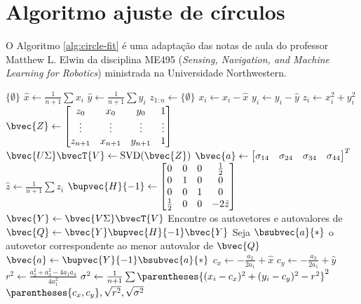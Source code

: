 \section{Algoritmo ajuste de círculos}
\label{annex:circle-fit}
O Algoritmo \ref{alg:circle-fit} é uma adaptação das notas de aula do 
professor Matthew L. Elwin da disciplina ME495 (\textit{Sensing, Navigation, and Machine Learning for Robotics}) ministrada na 
Universidade Northwestern.
\begin{algorithm}[h]
  \caption{}
  \label{alg:circle-fit}
\begin{algorithmic}[1]
      \State \Return $\{\emptyset\}$
    \EndIf
    \State $\hat{x} \gets \frac{1}{n+1} \sum x_i$
    \State $\hat{y} \gets \frac{1}{n+1} \sum y_i$
    \State $z_{1:n} \gets \{ \emptyset \}$
      \State $x_i \gets x_i - \hat{x}$
      \State $y_i \gets y_i - \hat{y}$
      \State $z_i \gets x_i^2 + y_i^2$
    \EndFor
    \State $\displaystyle \bvec{Z} \gets \begin{bmatrix}
      z_0 & x_0 & y_0 & 1 \\ 
      \vdots & \vdots & \vdots & \vdots \\
      z_{n+1} & x_{n+1} & y_{n+1} & 1 \\ 
    \end{bmatrix}$
    \State $\bvec{U \Sigma} \bvecT{V} \gets \SVD(\bvec{Z})$
      \State $ \bvec{a}\gets \begin{bmatrix}\sigma_{14}  & \sigma_{24} & \sigma_{34} & \sigma_{44} \end{bmatrix}^T$
    \Else
      \State $\hat{z} \gets \frac{1}{n+1} \sum z_i$
      \State $\displaystyle \bupvec{H}{-1} \gets \begin{bmatrix}
        0 & 0 & 0 & \frac{1}{2}\\
        0 & 1 & 0 & 0\\
        0 & 0 & 1 & 0\\
        \frac{1}{2} & 0 & 0 & -2\hat{z}
      \end{bmatrix}$
      \State $\bvec{Y} \gets \bvec{V \Sigma}\bvecT{V}$
      \State Encontre os autovetores e autovalores de $\bvec{Q} \gets \bvec{Y}\bupvec{H}{-1}\bvec{Y}$
      \State Seja $\bsubvec{a}{*}$ o autovetor correspondente ao menor autovalor de $\bvec{Q}$
      \State $\bvec{a} \gets \bupvec{Y}{-1} \bsubvec{a}{*}$
    \EndIf
    \State $c_x \gets -\frac{a_2}{2 a_1} + \hat{x}$
    \State $c_y \gets -\frac{a_3}{2 a_1} + \hat{y}$
    \State $r^2 \gets \frac{a_2^2 + a_3^2 - 4 a_1 a_4}{4 a_1^2}$
    \State $\sigma^2 \gets \frac{1}{n+1} \sum \parentheses{(x_i - c_x)^2 + (y_i - c_y)^2 -r^2}^2$
    \State \Return $\parentheses{c_x, c_y}, \sqrt{r^2}, \sqrt{\sigma^2}$
  \EndProcedure
\end{algorithmic}
\end{algorithm}
